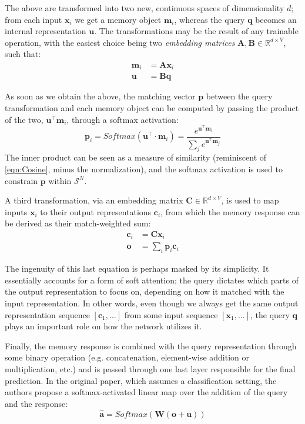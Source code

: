 \documentclass[]{article}
\begin{document}
The above are transformed into two new, continuous spaces of dimensionality $d$; from each input $\pmb{x}_i$ we get a memory object $\pmb{m}_i$, whereas the query $\pmb{q}$ becomes an internal representation $\pmb{u}$. The transformations may be the result of any trainable operation, with the easiest choice being two \textit{embedding matrices} $\pmb{A}, \pmb{B} \in \mathbb{R}^{d\times V}$, such that:
\begin{align}
\pmb{m}_i &= \pmb{A}\pmb{x}_i \tag{Memory Transformation} \\
\pmb{u} &= \pmb{B}\pmb{q} \tag{Query Transformation}
\end{align}

As soon as we obtain the above, the matching vector $\pmb{p}$ between the query transformation and each memory object can be computed by passing the product of the two, $\pmb{u}^\top \pmb{m}_i$, through a softmax activation:
\[
\tag{Memory Matching}
\pmb{p}_i = Softmax(\pmb{u}^\top \cdot \pmb{m}_i) = \frac{e^{\pmb{u}^\top\pmb{m}_i}}{\sum_j{e^{\pmb{u}^\top\pmb{m}_j}}}
\]
The inner product can be seen as a measure of similarity (reminiscent of \ref{eqn:Cosine}, minus the normalization), and the softmax activation is used to constrain $\pmb{p}$ within $\mathcal{S}^N$. 

A third transformation, via an embedding matrix $\pmb{C} \in \mathbb{R}^{d\times V}$, is used to map inputs $\pmb{x}_i$ to their output representations $\pmb{c}_i$, from which the memory response can be derived as their match-weighted sum:
\begin{align}
\tag{Output Transformation}
\pmb{c}_i &= \pmb{C}\pmb{x}_i\\
\tag{Memory Response}
\pmb{o} &= \sum\limits_i{\pmb{p}_i\pmb{c}_i}
\end{align}

The ingenuity of this last equation is perhaps masked by its simplicity. It essentially accounts for a form of soft attention; the query dictates which parts of the output representation to focus on, depending on how it matched with the input representation. In other words, even though we always get the same output representation sequence $[\pmb{c}_1,\dots]$ from some input sequence $[\pmb{x}_1,\dots]$, the query $\pmb{q}$ plays an important role on how the network utilizes it.

Finally, the memory response is combined with the query representation through some binary operation (e.g. concatenation, element-wise addition or multiplication, etc.) and is passed through one last layer responsible for the final prediction. In the original paper, which assumes a classification setting, the authors propose a softmax-activated linear map over the addition of the query and the response:
\[
\tag{Final Prediction}
\hat{\pmb{a}} = Softmax(\pmb{W} (\pmb{o}+\pmb{u}))
\]
\end{document}
